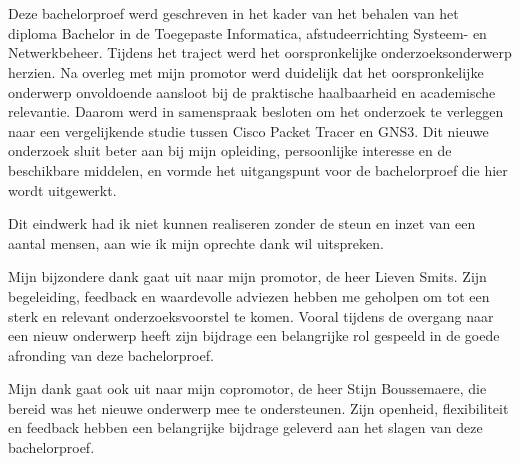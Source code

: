 
\chapter*{}%
\label{ch:voorwoord}


Deze bachelorproef werd geschreven in het kader van het behalen van het diploma Bachelor in de Toegepaste Informatica, afstudeerrichting Systeem- en Netwerkbeheer. Tijdens het traject werd het oorspronkelijke onderzoeksonderwerp herzien. Na overleg met mijn promotor werd duidelijk dat het oorspronkelijke onderwerp onvoldoende aansloot bij de praktische haalbaarheid en academische relevantie. Daarom werd in samenspraak besloten om het onderzoek te verleggen naar een vergelijkende studie tussen Cisco Packet Tracer en GNS3. Dit nieuwe onderzoek sluit beter aan bij mijn opleiding, persoonlijke interesse en de beschikbare middelen, en vormde het uitgangspunt voor de bachelorproef die hier wordt uitgewerkt.

\vspace{0.3cm}

Dit eindwerk had ik niet kunnen realiseren zonder de steun en inzet van een aantal mensen, aan wie ik mijn oprechte dank wil uitspreken.

\vspace{0.3cm}

Mijn bijzondere dank gaat uit naar mijn promotor, de heer Lieven Smits. Zijn begeleiding, feedback en waardevolle adviezen hebben me geholpen om tot een sterk en relevant onderzoeksvoorstel te komen. Vooral tijdens de overgang naar een nieuw onderwerp heeft zijn bijdrage een belangrijke rol gespeeld in de goede afronding van deze bachelorproef.

\vspace{0.3cm}

Mijn dank gaat ook uit naar mijn copromotor, de heer Stijn Boussemaere, die bereid was het nieuwe onderwerp mee te ondersteunen. Zijn openheid, flexibiliteit en feedback hebben een belangrijke bijdrage geleverd aan het slagen van deze bachelorproef.